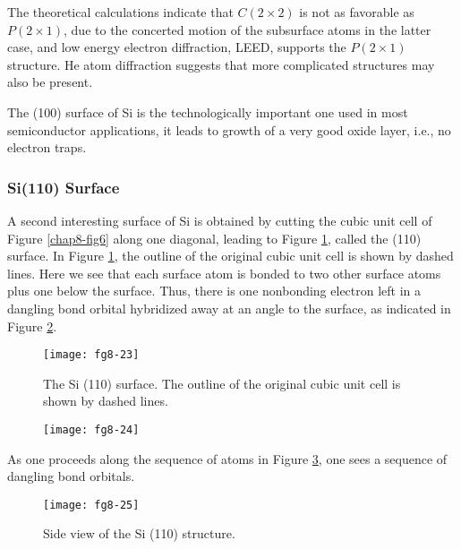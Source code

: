 The theoretical calculations 
indicate that $C(2 \times 2)$ is not as favorable as $P(2 \times 1)$, 
due to the concerted motion of the subsurface atoms in the
latter case, and low energy electron diffraction, LEED, supports the 
$P(2 \times 1)$ structure.  He atom diffraction suggests that more 
complicated structures may also be 
present.

The (100) surface of Si is the technologically important one used in most 
semiconductor applications, it leads to growth of a very good oxide layer, 
i.e., no electron traps.

\subsubsection{Si(110) Surface}

A second interesting surface of Si is obtained by cutting the cubic
unit cell of Figure \ref{chap8-fig6} along one diagonal, leading to
Figure \ref{chap8-fig23}, called the (110) surface.  In Figure
\ref{chap8-fig23}, the outline of the original cubic unit cell is
shown by dashed lines.  Here we see that each surface atom is bonded
to two other surface atoms plus one below the surface.  Thus, there is
one nonbonding electron left in a dangling bond orbital hybridized
away at an angle to the surface, as indicated in Figure
\ref{chap8-fig24}.

\begin{figure}
\begin{center}
\texttt{[image: fg8-23]}
\end{center}
\caption{The Si (110) surface. The outline of the original cubic unit
cell is shown by dashed lines.}
\label{chap8-fig23}
\end{figure}

\begin{figure}
\begin{center}
\texttt{[image: fg8-24]}
\end{center}
\caption{}
\label{chap8-fig24}
\end{figure}

As one proceeds along the sequence of atoms in Figure
\ref{chap8-fig25}, one sees a sequence of dangling bond orbitals.

\begin{figure}
\begin{center}
\texttt{[image: fg8-25]}
\end{center}
\caption{Side view of the Si (110) structure.}
\label{chap8-fig25}
\end{figure}

